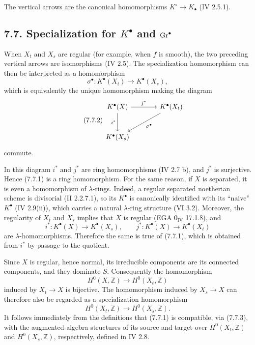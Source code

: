 The vertical arrows are the canonical homomorphisms
$K^\circ\to K_\bullet$ (IV 2.5.1).

\subsection*{7.7. Specialization for $K^\bullet$ and $\operatorname{Gr}^\bullet$}
When $X_t$ and $X_s$ are regular (for example, when $f$ is smooth), the two
preceding vertical arrows are isomorphisms (IV 2.5). The specialization
homomorphism can then be interpreted as a homomorphism
\begin{equation}\tag{7.7.1}
\sigma^\bullet:K^\bullet(X_t)\longrightarrow K^\bullet(X_s),
\end{equation}
which is equivalently the unique homomorphism making the diagram
\begin{equation}\tag{7.7.2}
\begin{tikzcd}[column sep=large,row sep=large]
K^\bullet(X) \arrow[r,"j^*"] \arrow[d,"i^*"'] &
K^\bullet(X_t) \arrow[dl,"\sigma^\bullet"]\\
K^\bullet(X_s) &
\end{tikzcd}
\end{equation}
commute.

In this diagram $i^*$ and $j^*$ are ring homomorphisms (IV 2.7 b), and
$j^*$ is surjective. Hence (7.7.1) is a ring homomorphism. For the same
reason, if $X$ is separated, it is even a homomorphism of $\lambda$-rings.
Indeed, a regular separated noetherian scheme is divisorial (II 2.2.7.1),
so its $K^\bullet$ is canonically identified with its ``naive''
$K^\bullet$ (IV 2.9(ii)), which carries a natural $\lambda$-ring structure
(VI 3.2). Moreover, the regularity of $X_t$ and $X_s$ implies that $X$ is
regular (EGA $0_{\mathrm{IV}}$ 17.1.8), and
\[
i^*:K^\bullet(X)\longrightarrow K^\bullet(X_s),
\qquad
j^*:K^\bullet(X)\longrightarrow K^\bullet(X_t)
\]
are $\lambda$-homomorphisms. Therefore the same is true of (7.7.1), which
is obtained from $i^*$ by passage to the quotient.

Since $X$ is regular, hence normal, its irreducible components are its
connected components, and they dominate $S$. Consequently the homomorphism
\[
H^0(X,\mathbb Z)\longrightarrow H^0(X_t,\mathbb Z)
\]
induced by $X_t\to X$ is bijective. The homomorphism induced by
$X_s\to X$ can therefore also be regarded as a specialization homomorphism
\begin{equation}\tag{7.7.3}
H^0(X_t,\mathbb Z)\longrightarrow H^0(X_s,\mathbb Z).
\end{equation}
It follows immediately from the definitions that (7.7.1) is compatible,
via (7.7.3), with the augmented-algebra structures of its source and target
over $H^0(X_t,\mathbb Z)$ and $H^0(X_s,\mathbb Z)$, respectively, defined
in IV 2.8.

